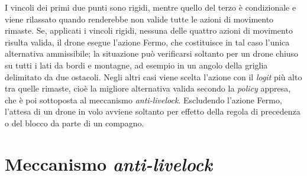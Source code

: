 \documentclass[12pt,a4paper,twoside]{report}
\begin{document}
I vincoli dei primi due punti sono rigidi, mentre quello del terzo è condizionale e viene rilassato quando renderebbe non valide tutte le azioni di movimento rimaste. Se, applicati i vincoli rigidi, nessuna delle quattro azioni di movimento risulta valida, il drone esegue l'azione Fermo, che costituisce in tal caso l'unica alternativa ammissibile; la situazione può verificarsi soltanto per un drone chiuso su tutti i lati da bordi e montagne, ad esempio in un angolo della griglia delimitato da due ostacoli. Negli altri casi viene scelta l'azione con il \emph{logit} più alto tra quelle rimaste, cioè la migliore alternativa valida secondo la \emph{policy} appresa, che è poi sottoposta al meccanismo \emph{anti-livelock}. Escludendo l'azione Fermo, l'attesa di un drone in volo avviene soltanto per effetto della regola di precedenza o del blocco da parte di un compagno.
\newpage
\section{Meccanismo \emph{anti-livelock}}
\label{sec:anti_livelock}
\end{document}

